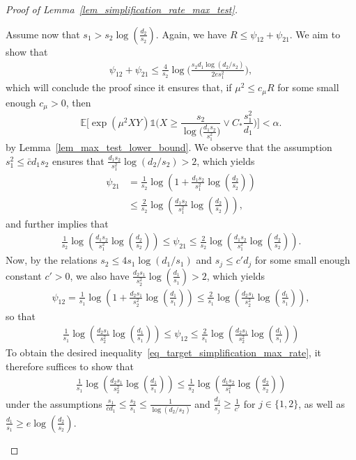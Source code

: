 \documentclass{article}
\newcommand{\EE}{\mathbb{E}}
\newcommand{\one}{\mathds{1}}
\newcommand{\Ct}{C_{*}}
\theoremstyle{remark}
\begin{document}
\begin{proof}[Proof of Lemma~\ref{lem_simplification_rate_max_test}]
\begin{enumerate}
    Assume now that $s_1 > s_2\log\left(\frac{d_2}{s_2}\right)$. 
    Again, we have $R \leq \psi_{12} + \psi_{21}$. 
    We aim to show that
    \begin{align}
        \psi_{12} + \psi_{21} \leq \frac{4}{s_2}\log\big(\frac{s_2d_1\log(d_2/s_2)}{2es_1^2}\big),\label{eq_target_simplification_max_rate}
    \end{align}
    which will conclude the proof since it ensures that, if $\mu^2 \leq c_\mu R$ for some small enough $c_\mu>0$, then 
    $$\EE\Big[\exp(\mu^2XY)\one\Big(X \geq \frac{s_2}{\log\big(\frac{d_1s_2}{s_1^2}\big)}\lor  \Ct \frac{s_1^2}{d_1}\Big)\Big] < \alpha.$$ 
    by Lemma~\ref{lem_max_test_lower_bound}.
    We observe that the assumption $s_1^2 \leq \bar c d_1 s_2$ ensures that $\frac{d_1s_2}{s_1^2}\log(d_2/s_2) > 2$, which yields
    \begin{align*}
        \psi_{21} &= \frac{1}{s_2} \log\left(1+ \frac{d_1s_2}{s_1^2} \log\left(\frac{d_2}{s_2}\right)\right) \\
        & \leq \frac{2}{s_2} \log\left(\frac{d_1s_2}{s_1^2} \log\left(\frac{d_2}{s_2}\right)\right),
    \end{align*}   
    and further implies that 
    \begin{align}
        \frac{1}{s_2} \log\left(\frac{d_1s_2}{s_1^2} \log\left(\frac{d_2}{s_2}\right)\right) \leq \psi_{21}  \leq \frac{2}{s_2} \log\left(\frac{d_1s_2}{s_1^2} \log\left(\frac{d_2}{s_2}\right)\right).\label{eq_equiv_psi21}
    \end{align}
    Now, by the relations $s_2 \leq 4 s_1\log(d_1/s_1)$ and $s_j \leq c' d_j$ for some small enough constant $c'>0$, we also have $\frac{d_2s_1}{s_2^2} \log\left(\frac{d_1}{s_1}\right)>2$, which yields
    \begin{align*}
        \psi_{12} = \frac{1}{s_1} \log\left(1+ \frac{d_2s_1}{s_2^2} \log\left(\frac{d_1}{s_1}\right)\right) \leq \frac{2}{s_1} \log\left( \frac{d_2s_1}{s_2^2} \log\left(\frac{d_1}{s_1}\right)\right),
    \end{align*}
    so that
    \begin{align}
        \frac{1}{s_1} \log\left( \frac{d_2s_1}{s_2^2} \log\left(\frac{d_1}{s_1}\right)\right) \leq \psi_{12} \leq \frac{2}{s_1} \log\left( \frac{d_2s_1}{s_2^2} \log\left(\frac{d_1}{s_1}\right)\right) \label{eq_equiv_psi12}
    \end{align}
    To obtain the desired inequality~\eqref{eq_target_simplification_max_rate}, it therefore suffices to show that 
    \begin{align}
        \frac{1}{s_1} \log\left( \frac{d_2s_1}{s_2^2} \log\left(\frac{d_1}{s_1}\right)\right) \leq \frac{1}{s_2} \log\left( \frac{d_1s_2}{s_1^2} \log\left(\frac{d_2}{s_2}\right)\right)\label{eq_new_target}
    \end{align}
    under the assumptions $\frac{s_1}{\bar c d_1} \leq \frac{s_2}{s_1} \leq \frac{1}{\log(d_2/s_2)}$ and $\frac{d_j}{s_j} \geq \frac{1}{c'}$ for $j\in\{1,2\}$, as well as $\frac{d_1}{s_1} \geq e \log\left(\frac{d_2}{s_2}\right)$. 
    

\end{enumerate}
\end{proof}
\end{document}

